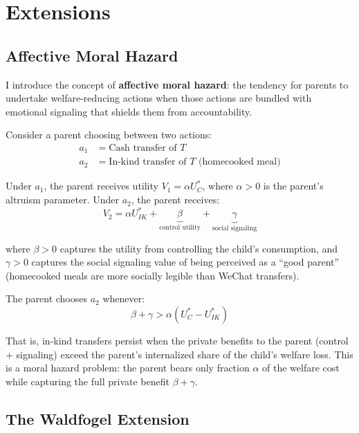 \documentclass[AER]{AEA}
\begin{document}
\section{Extensions}\label{sec:extensions}

\subsection{Affective Moral Hazard}

I introduce the concept of \textbf{affective moral hazard}: the tendency for parents to undertake welfare-reducing actions when those actions are bundled with emotional signaling that shields them from accountability.

Consider a parent choosing between two actions:
\begin{align}
a_1 &= \text{Cash transfer of } T \label{eq:a1}\\
a_2 &= \text{In-kind transfer of } T \text{ (homecooked meal)} \label{eq:a2}
\end{align}

Under $a_1$, the parent receives utility $V_1 = \alpha U^*_C$, where $\alpha > 0$ is the parent's altruism parameter. Under $a_2$, the parent receives:
\begin{equation}
V_2 = \alpha U^*_{IK} + \underbrace{\beta}_{\text{control utility}} + \underbrace{\gamma}_{\text{social signaling}}
\end{equation}

where $\beta > 0$ captures the utility from controlling the child's consumption, and $\gamma > 0$ captures the social signaling value of being perceived as a ``good parent'' (homecooked meals are more socially legible than WeChat transfers).

The parent chooses $a_2$ whenever:
\begin{equation}
\beta + \gamma > \alpha(U^*_C - U^*_{IK})
\end{equation}

That is, in-kind transfers persist when the private benefits to the parent (control + signaling) exceed the parent's internalized share of the child's welfare loss. This is a moral hazard problem: the parent bears only fraction $\alpha$ of the welfare cost while capturing the full private benefit $\beta + \gamma$.

\subsection{The Waldfogel Extension}
\end{document}

